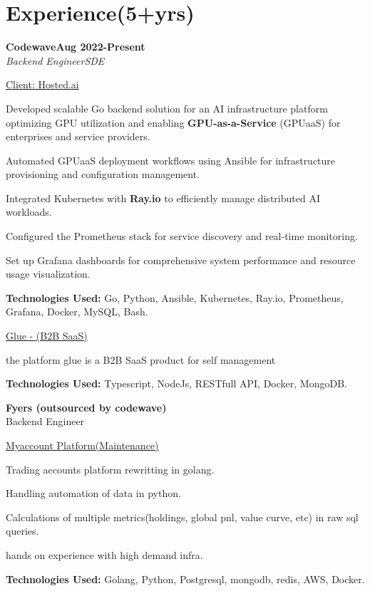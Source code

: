 \documentclass[letterpaper,10pt]{article}
\newcommand{\heading}[2]{
  \hspace{10pt}#1\hfill#2\\
}
\newcommand{\headingBf}[2]{
  \heading{\textbf{#1}}{\textbf{#2}}
}
\newcommand{\headingIt}[2]{
  \heading{\textit{#1}}{\textit{#2}}
}
\newenvironment{resume_list}{
  \vspace{-7pt}
  \begin{itemize}[itemsep=-2px, parsep=1pt, leftmargin=30pt]
}{
  \end{itemize}
}
\newcommand{\itemTitle}[1]{
  \item[] \underline{#1}\vspace{4pt}
}
\begin{document}

  \section{Experience(5+yrs)}

  \headingBf{Codewave}{Aug 2022-Present}
  \headingIt{Backend Engineer}{SDE}

  \begin{resume_list}

\itemTitle{Client: Hosted.ai}
\item Developed scalable Go backend solution for an AI infrastructure platform optimizing GPU utilization and enabling \textbf{GPU-as-a-Service} (GPUaaS) for enterprises and service providers.
\item Automated GPUaaS deployment workflows using Ansible for infrastructure provisioning and configuration management.
\item Integrated Kubernetes with \textbf{Ray.io} to efficiently manage distributed AI workloads.
\item Configured the Prometheus stack for service discovery and real-time monitoring.
\item Set up Grafana dashboards for comprehensive system performance and resource usage visualization.
\item \textbf{Technologies Used:} Go, Python, Ansible, Kubernetes, Ray.io, Prometheus, Grafana, Docker, MySQL, Bash.
\vspace{3pt}

\itemTitle{Glue - (B2B SaaS)}
\item the platform glue is a B2B SaaS product for self management
\item \textbf{Technologies Used:} Typescript, NodeJs, RESTfull API, Docker, MongoDB.
\vspace{3pt}


\end{resume_list}

\headingBf{Fyers (outsourced by codewave)}
\headingIt{Backend Engineer}

  \begin{resume_list}
  \itemTitle{Myaccount Platform(Maintenance) }
  \item Trading accounts platform rewritting in golang.
  \item Handling automation of data in python.
  \item Calculations of multiple metrics(holdings, global pnl, value curve, etc) in raw sql queries.
  \item hands on experience with high demand infra.
  \item \textbf{Technologies Used:} Golang, Python, Postgresql, mongodb, redis, AWS, Docker.
  \vspace{3pt}
  \end{resume_list}
\end{document}
